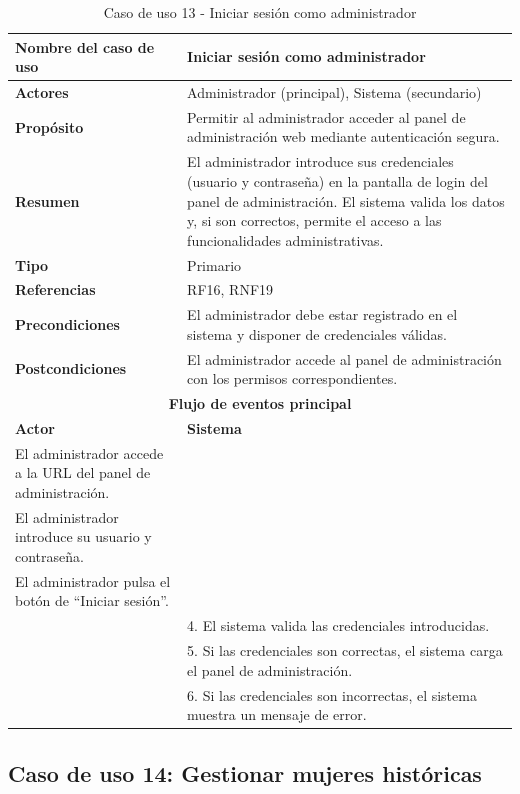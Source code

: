 \begin{table}[H]
\centering
\caption{Caso de uso 13 - Iniciar sesión como administrador}
\begin{tabular}{|p{4.5cm}|p{10.5cm}|}
\hline
\textbf{Nombre del caso de uso} & Iniciar sesión como administrador \\
\hline
\textbf{Actores} & Administrador (principal), Sistema (secundario) \\
\hline
\textbf{Propósito} & Permitir al administrador acceder al panel de administración web mediante autenticación segura. \\
\hline
\textbf{Resumen} & El administrador introduce sus credenciales (usuario y contraseña) en la pantalla de login del panel de administración. El sistema valida los datos y, si son correctos, permite el acceso a las funcionalidades administrativas. \\
\hline
\textbf{Tipo} & Primario \\
\hline
\textbf{Referencias} & RF16, RNF19 \\
\hline
\textbf{Precondiciones} & El administrador debe estar registrado en el sistema y disponer de credenciales válidas. \\
\hline
\textbf{Postcondiciones} & El administrador accede al panel de administración con los permisos correspondientes. \\
\hline
\multicolumn{2}{|c|}{\textbf{Flujo de eventos principal}} \\
\hline
\textbf{Actor} & \textbf{Sistema} \\
\hline
El administrador accede a la URL del panel de administración. & \\
\hline
El administrador introduce su usuario y contraseña. & \\
\hline
El administrador pulsa el botón de “Iniciar sesión”. & \\
\hline
& 4. El sistema valida las credenciales introducidas. \\
\hline
& 5. Si las credenciales son correctas, el sistema carga el panel de administración. \\
\hline
& 6. Si las credenciales son incorrectas, el sistema muestra un mensaje de error. \\
\hline
\end{tabular}
\end{table}

\clearpage
\subsection{Caso de uso 14: Gestionar mujeres históricas}

